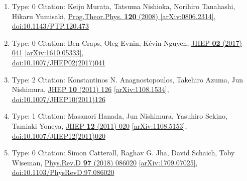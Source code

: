 \documentclass[a4paper,10pt]{article}
\begin{document}
\begin{enumerate}
\begin{enumerate}
  \item Type: 0 Citation: Keiju Murata, Tatsuma Nishioka, Norihiro Tanahashi, Hikaru Yumisaki, \href{https://www.doi.org/10.1143/PTP.120.473}{Prog.Theor.Phys. {\bf 120} (2008) }  \href{https://arxiv.org/abs/0806.2314}{[arXiv:0806.2314]},\\\href{https://www.doi.org/10.1143/PTP.120.473}{doi:10.1143/PTP.120.473}
  \item Type: 0 Citation: Ben Craps, Oleg Evnin, Kévin Nguyen, \href{https://www.doi.org/10.1007/JHEP02(2017)041}{JHEP {\bf 02} (2017) 041}  \href{https://arxiv.org/abs/1610.05333}{[arXiv:1610.05333]},\\\href{https://www.doi.org/10.1007/JHEP02(2017)041}{doi:10.1007/JHEP02(2017)041}
  \item Type: 2 Citation: Konstantinos N. Anagnostopoulos, Takehiro Azuma, Jun Nishimura, \href{https://www.doi.org/10.1007/JHEP10(2011)126}{JHEP {\bf 10} (2011) 126}  \href{https://arxiv.org/abs/1108.1534}{[arXiv:1108.1534]},\\\href{https://www.doi.org/10.1007/JHEP10(2011)126}{doi:10.1007/JHEP10(2011)126}
  \item Type: 1 Citation: Masanori Hanada, Jun Nishimura, Yasuhiro Sekino, Tamiaki Yoneya, \href{https://www.doi.org/10.1007/JHEP12(2011)020}{JHEP {\bf 12} (2011) 020}  \href{https://arxiv.org/abs/1108.5153}{[arXiv:1108.5153]},\\\href{https://www.doi.org/10.1007/JHEP12(2011)020}{doi:10.1007/JHEP12(2011)020}
  \item Type: 0 Citation: Simon Catterall, Raghav G. Jha, David Schaich, Toby Wiseman, \href{https://www.doi.org/10.1103/PhysRevD.97.086020}{Phys.Rev.D {\bf 97} (2018) 086020}  \href{https://arxiv.org/abs/1709.07025}{[arXiv:1709.07025]},\\\href{https://www.doi.org/10.1103/PhysRevD.97.086020}{doi:10.1103/PhysRevD.97.086020}

\end{enumerate}
\end{enumerate}
\end{document}
